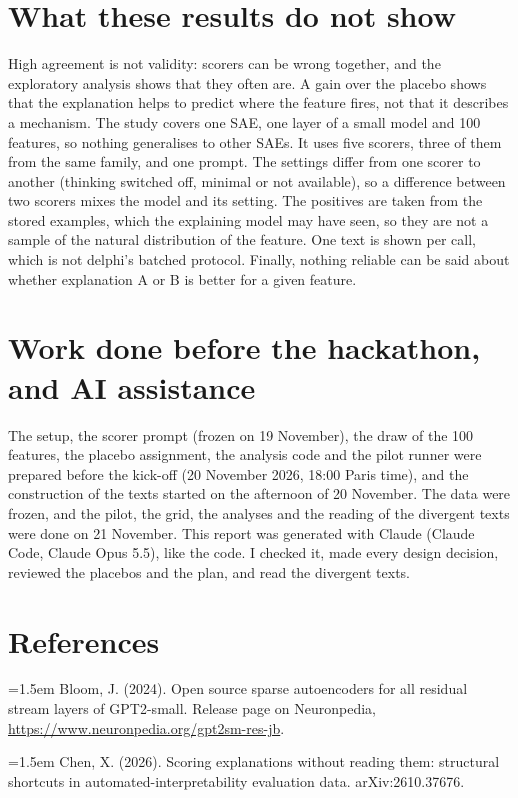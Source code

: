 \documentclass[11pt]{article}
\newcommand{\bibentree}[1]{\par\noindent\hangindent=1.5em\hangafter=1 #1\par\vspace{0.5em}}
\begin{document}
\section*{What these results do not show}

High agreement is not validity: scorers can be wrong together, and the exploratory
analysis shows that they often are. A gain over the placebo shows that the explanation
helps to predict where the feature fires, not that it describes a mechanism. The study
covers one SAE, one layer of a small model and 100 features, so nothing generalises to
other SAEs. It uses five scorers, three of them from the same family, and one prompt.
The settings differ from one scorer to another (thinking switched off, minimal or not
available), so a difference between two scorers mixes the model and its setting. The
positives are taken from the stored examples, which the explaining model may have seen,
so they are not a sample of the natural distribution of the feature. One text is shown
per call, which is not delphi's batched protocol. Finally, nothing reliable can be said
about whether explanation A or B is better for a given feature.

\section*{Work done before the hackathon, and AI assistance}

The setup, the scorer prompt (frozen on 19 November), the draw of the 100 features, the
placebo assignment, the analysis code and the pilot runner were prepared before the
kick-off (20 November 2026, 18:00 Paris time), and the construction of the texts started on the afternoon of 20 November. The data
were frozen, and the pilot, the grid, the analyses and the reading of the divergent
texts were done on 21 November. This report was generated with Claude (Claude Code,
Claude Opus 5.5), like the code. I checked it, made every design decision, reviewed the
placebos and the plan, and read the divergent texts.

\section*{References}

\bibentree{Bloom, J. (2024). Open source sparse autoencoders for all residual stream
layers of GPT2-small. Release page on Neuronpedia,
\url{https://www.neuronpedia.org/gpt2sm-res-jb}.}

\bibentree{Chen, X. (2026). Scoring explanations without reading them: structural
shortcuts in automated-interpretability evaluation data. arXiv:2610.37676.}
\end{document}
